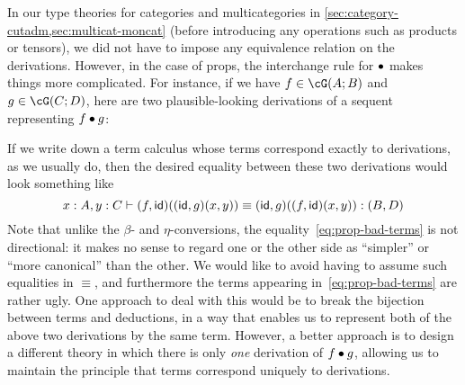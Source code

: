 \begin{props}
In our type theories for categories and multicategories in \cref{sec:category-cutadm,sec:multicat-moncat} (before introducing any operations such as products or tensors), we did not have to impose any equivalence relation on the derivations.
However, in the case of props, the interchange rule for $\bullet$ makes things more complicated.
For instance, if we have $f\in \cG(A;B)$ and $g\in\cG(C;D)$, here are two plausible-looking derivations of a sequent representing $f\bullet g$:
If we write down a term calculus whose terms correspond exactly to derivations, as we usually do, then the desired equality between these two derivations would look something like
\begin{equation}
  x:A, y:C \types (f,\idfunc)((\idfunc,g)(x,y)) \equiv (\idfunc,g)((f,\idfunc)(x,y)) : (B,D)\label{eq:prop-bad-terms}
\end{equation}
Note that unlike the $\beta$- and $\eta$-conversions, the equality~\eqref{eq:prop-bad-terms} is not directional: it makes no sense to regard one or the other side as ``simpler'' or ``more canonical'' than the other.
We would like to avoid having to assume such equalities in $\equiv$, and furthermore the terms appearing in~\eqref{eq:prop-bad-terms} are rather ugly.
One approach to deal with this would be to break the bijection between terms and deductions, in a way that enables us to represent both of the above two derivations by the same term.
However, a better approach is to design a different theory in which there is only \emph{one} derivation of $f\bullet g$, allowing us to maintain the principle that terms correspond uniquely to derivations.


\end{props}
